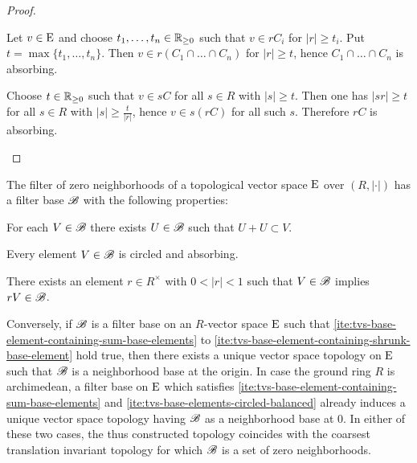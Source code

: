 \begin{proof}
  \begin{adromanlist}
  \item
    Let $v\in\mathrm{E}$ and choose $t_1,\ldots,t_n\in \mathbb{R}_{\geq 0}$ such that
    $v \in rC_i$ for $|r|\geq t_i$. Put $t = \max \{ t_1,\ldots , t_n\}$.
    Then $v \in r (C_1\cap\ldots \cap C_n)$ for $|r|\geq t$, hence $C_1\cap\ldots \cap C_n$ is absorbing.
  \item  
    Choose $t\in \mathbb{R}_{\geq 0}$ such that  $v \in sC$ for all $s\in R$ with $|s|\geq t$.
    Then one has $|sr| \geq t$ for all $s\in R$ with $|s|\geq \frac{t}{|r|}$, hence $v \in s (rC)$
    for all such $s$. Therefore $rC$ is absorbing. 
  \end{adromanlist}
\end{proof}

\begin{proposition}\label{thm:topological-vector-space-zero-neighborhood-filter-base-circled-absorbing}
  The filter of zero neighborhoods of a topological vector space $\mathrm{E}$ over
  $(R,|\cdot|)$ has a filter base $\mathscr{B}$ with the following properties:
  \begin{romanlist}
  \item\label{ite:tvs-base-element-containing-sum-base-elements}
    For each $V \in \mathscr{B}$ there exists $U\in\mathscr{B}$ such that $U+U \subset V$.
  \item\label{ite:tvs-base-elements-circled-balanced}
    Every element $V\in \mathscr{B}$ is circled and absorbing.
  \item\label{ite:tvs-base-element-containing-shrunk-base-element}
    There exists an element $r\in R^\times$ with $0< |r| < 1$ such that $V\in \mathscr{B}$ implies
    $rV \in \mathscr{B}$. 
  \end{romanlist}
  Conversely, if  $\mathscr{B}$ is a filter base on an $R$-vector space $\mathrm{E}$ such that 
  \ref{ite:tvs-base-element-containing-sum-base-elements} to \ref{ite:tvs-base-element-containing-shrunk-base-element}
  hold true, then there exists a unique vector space topology on $\mathrm{E}$  such that $\mathscr{B}$ is a neighborhood base
  at the origin.  In case the ground ring $R$ is archimedean, a filter base on $\mathrm{E}$ which satisfies
  \ref{ite:tvs-base-element-containing-sum-base-elements} and \ref{ite:tvs-base-elements-circled-balanced}
  already induces a unique vector space topology having $\mathscr{B}$ as a neighborhood base
  at $0$.
  In either of these two cases, the thus constructed topology coincides with the coarsest translation invariant topology for which $\mathscr{B}$ is a set of zero neighborhoods.
\end{proposition}

